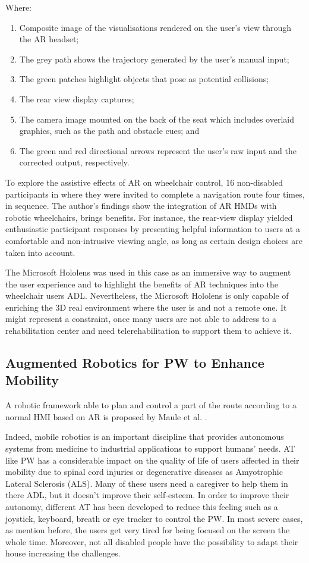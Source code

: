 Where: 
\begin{enumerate}
\item Composite image of the visualisations rendered on the
user’s view through the AR headset;
\item The grey path shows the trajectory generated by the user’s manual input;
\item The green patches highlight objects that pose as potential collisions;
\item The rear view display captures;
\item The camera image mounted on the back of the seat which includes overlaid graphics, such as the path and obstacle cues; and
\item The green and red directional arrows represent the user’s raw input and the corrected output, respectively.
\end{enumerate}

To explore the assistive effects of AR on wheelchair control, 16 non-disabled participants in where they were invited to complete a navigation route four times, in sequence.
The author's findings show the integration of AR HMDs with robotic wheelchairs, brings benefits. For instance, the rear-view display yielded enthusiastic participant responses by presenting helpful information to users at a comfortable and non-intrusive viewing angle, as long as certain design choices are taken into account.

The Microsoft Hololens was used in this case as an immersive way to augment the user experience and to highlight the benefits of AR techniques into the wheelchair users ADL. Nevertheless, the Microsoft Hololens is only capable of enriching the 3D real environment where the user is and not a remote one. It might represent a constraint, once many users are not able to address to a rehabilitation center and need telerehabilitation to support them to achieve it.

\subsection{Augmented Robotics for PW to Enhance Mobility}
A robotic framework able to plan and control a part of the route according to a normal HMI based on AR is proposed by Maule et al. \cite{maule2017}. 

Indeed, mobile robotics is an important discipline that provides autonomous systems from medicine to industrial applications to support humans' needs. AT like PW has a considerable impact on the quality of life of users affected in their mobility due to spinal cord injuries or degenerative diseases as Amyotrophic Lateral Sclerosis (ALS). Many of these users need a caregiver to help them in there ADL, but it doesn't improve their self-esteem. In order to improve their autonomy, different AT has been developed to reduce this feeling such as a joystick, keyboard, breath or eye tracker to control the PW. In most severe cases, as mention before, the users get very tired for being focused on the screen the whole time. Moreover, not all disabled people have the possibility to adapt their house increasing the challenges. 

